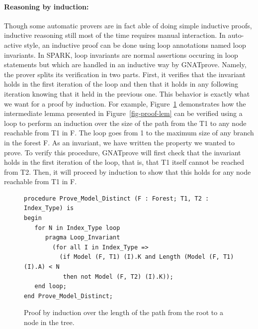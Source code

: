 \documentclass[11pt,a4paper]{article}
\begin{document}
\paragraph{Reasoning by induction:}
Though some automatic provers are in fact able of doing simple inductive proofs, inductive reasoning
still most of the time requires manual interaction. In auto-active style, an inductive proof can be done
using loop annotations named loop invariants. In SPARK, loop invariants are normal assertions occuring in
loop statements but which are handled in an inductive way by GNATprove. Namely, the prover splits its
verification in two parts. First, it verifies that the invariant holds in the first iteration of the
loop and then that it holds in any following iteration knowing that it held in the previous one.
This behavior is exactly what we want for a proof by induction. For example, Figure~\ref{fig-proof-ind}
demonstrates how the intermediate lemma presented in Figure~\ref{fig-proof-lem} can be verified
using a loop to perform an induction over the size of the path from the T1 to any node reachable
from T1 in F. The loop goes from 1 to the maximum size of any branch in the forest F. As an
invariant, we have written the property we wanted to prove. To verify this procedure, GNATprove will
first check that the invariant holds in the first iteration of the loop, that is, that T1 itself cannot
be reached from T2. Then, it will proceed by induction to show that this holds for any node reachable
from T1 in F.

\begin{figure}
\begin{small}
\begin{lstlisting}
procedure Prove_Model_Distinct (F : Forest; T1, T2 : Index_Type) is
begin
   for N in Index_Type loop
      pragma Loop_Invariant
        (for all I in Index_Type =>
          (if Model (F, T1) (I).K and Length (Model (F, T1) (I).A) < N
           then not Model (F, T2) (I).K));
   end loop;
end Prove_Model_Distinct;
\end{lstlisting}
\end{small}
\caption{\label{fig-proof-ind} Proof by induction over the length of the path from the root to a node in the tree.}
\end{figure}
\end{document}
